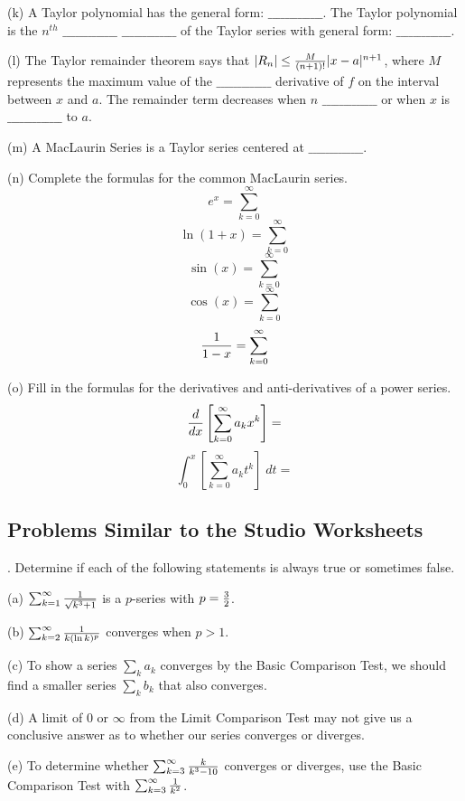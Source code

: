 \documentclass[12pt]{article}
\begin{document}
\medskip
\noindent (k) A Taylor polynomial has the general form: 
$\_\_\_\_\_\_\_\_\_\_\_\_\_$.  The Taylor polynomial is the 
$n^{th}$ $\_\_\_\_\_\_\_\_\_\_\_\_\_$ $\_\_\_\_\_\_\_\_\_\_\_\_\_$ of the Taylor series with general form: 
$\_\_\_\_\_\_\_\_\_\_\_\_\_$.

\medskip 
\noindent (l) The Taylor remainder theorem says that $|R_n| \le 
{{M}\over{(n+1)!}} |x-a|^{n+1}$, where $M$ represents 
the maximum value of the $\_\_\_\_\_\_\_\_\_\_\_\_\_$ derivative of $f$ on the interval between $x$ and $a$.  The 
remainder term decreases when $n$ $\_\_\_\_\_\_\_\_\_\_\_\_\_$ or when $x$ is $\_\_\_\_\_\_\_\_\_\_\_\_\_$ to $a$.

\medskip
\noindent (m) A MacLaurin Series is a Taylor series centered at 
$\_\_\_\_\_\_\_\_\_\_\_\_\_$.

\medskip 
\noindent (n) Complete the formulas for the common MacLaurin series.
$$e^x = \sum_{k=0}^{\infty}$$
$$\ln (1+x) = \sum_{k=0}^{\infty}$$
$$\sin (x) =  \sum_{k=0}^{\infty}$$
$$\cos (x) = \sum_{k=0}^{\infty}$$
$${{1}\over{1-x}} = \sum_{k=0}^{\infty}$$

\medskip
\noindent (o) Fill in the formulas for the derivatives and 
anti-derivatives of a power series.
$${{d}\over{dx}} \left [ \sum_{k=0}^{\infty} a_k x^k \right ]= $$
$$\int_0^x \left [ \sum_{k=0}^{\infty} a_k t^k \right ] \; dt = $$

\subsection*{Problems Similar to the Studio Worksheets}

.  Determine if each of the following statements is always true or sometimes false.

\noindent (a) $\sum_{k=1}^{\infty} {{1}\over{\sqrt{k^3+1}}}$ is a 
$p$-series with $p={{3}\over{2}}$.

\noindent (b) $\sum_{k=2}^{\infty} {{1}\over{k (\ln k)^p}}$ converges when 
$p > 1$.

\noindent (c) To show a series $\sum_k a_k$ converges by the Basic 
Comparison Test, we should find a smaller series $\sum_k b_k$ that also 
converges. 

\noindent (d) A limit of 0 or $\infty$ from the Limit Comparison Test may 
not give us a conclusive answer as to whether our series converges or 
diverges. 

\noindent (e) To determine whether $\sum_{k=3}^{\infty} 
{{k}\over{k^3-10}}$ converges or diverges, use the Basic Comparison 
Test with $\sum_{k=3}^{\infty} {{1}\over{k^2}}$.
\end{document}
